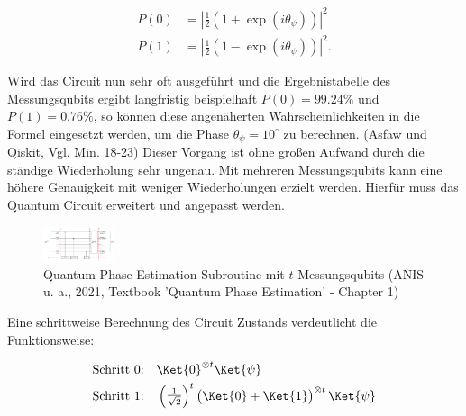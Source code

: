 \begin{equation}\begin{aligned}
        P(0) & = |\frac{1}{2}(1+\exp{(i\theta_\psi)})|^2  \\
        P(1) & = |\frac{1}{2}(1-\exp{(i\theta_\psi)})|^2.
    \end{aligned}\end{equation}

Wird das Circuit nun sehr oft ausgeführt und die Ergebnistabelle des Messungsqubits ergibt langfristig beispielhaft \(P(0) = 99.24\%\) und \(P(1) = 0.76\%\), so können diese angenäherten Wahrscheinlichkeiten in die Formel eingesetzt werden, um die Phase \(\theta_\psi = 10^\circ\) zu berechnen.  (Asfaw und Qiskit, Vgl. Min. 18-23) \newline
Dieser Vorgang ist ohne großen Aufwand durch die ständige Wiederholung sehr ungenau. Mit mehreren Messungsqubits kann eine höhere Genauigkeit mit weniger Wiederholungen erzielt werden. Hierfür muss das Quantum Circuit erweitert und angepasst werden.

\begin{figure}
    \includegraphics[width=80]{content/qpe.png}
    \caption{Quantum Phase Estimation Subroutine mit \(t\) Messungsqubits (ANIS u. a., 2021, Textbook ’Quantum Phase Estimation’ - Chapter 1)}
\end{figure}

Eine schrittweise Berechnung des Circuit Zustands verdeutlicht die Funktionsweise:

\begin{align*}
    \text{Schritt 0:}\quad & \Ket{0}^{\otimes t}\Ket{\psi}                                                                                         \\
    \text{Schritt 1:}\quad & \begin{pmatrix}
                                 \frac{1}{\sqrt{2}}\end{pmatrix}^t \begin{pmatrix}\Ket{0} + \Ket{1}\end{pmatrix}^{\otimes t}  \Ket{\psi}
\end{align*}


